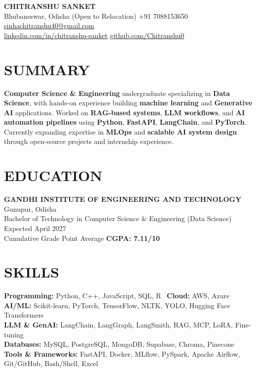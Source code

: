 \documentclass[a4paper,10pt]{article}
\begin{document}
\begin{center}
    {\LARGE \textbf{CHITRANSHU SANKET}} \\
    Bhubaneswar, Odisha (Open to Relocation) \quad
    \textbar \quad +91 7088153650 \quad
    \textbar \quad \href{mailto:sinhachitranshu40@gmail.com}{sinhachitranshu40@gmail.com} \\
    \href{https://www.linkedin.com/in/chitranshu-sanket}{linkedin.com/in/chitranshu-sanket}
    \textbar 
    \href{https://github.com/Chitranshu0}{ github.com/Chitranshu0}
\end{center}

\section*{SUMMARY}
\textbf{Computer Science \& Engineering} undergraduate specializing in \textbf{Data Science}, with hands-on experience building \textbf{machine learning} and \textbf{Generative AI} applications. Worked on \textbf{RAG-based systems}, \textbf{LLM workflows}, and \textbf{AI automation pipelines} using \textbf{Python}, \textbf{FastAPI}, \textbf{LangChain}, and \textbf{PyTorch}. Currently expanding expertise in \textbf{MLOps} and \textbf{scalable AI system design} through open-source projects and internship experience.

\section*{EDUCATION}
\textbf{GANDHI INSTITUTE OF ENGINEERING AND TECHNOLOGY} \hfill Gunupur, Odisha \\
Bachelor of Technology in Computer Science \& Engineering (Data Science) \hfill Expected April 2027 \\
Cumulative Grade Point Average \hfill \textbf{CGPA: 7.11/10}

\section*{SKILLS}
\textbf{Programming:} Python, C++, JavaScript, SQL, R \textbar\ \textbf{Cloud:} AWS, Azure\\
\textbf{AI/ML:} Scikit-learn, PyTorch, TensorFlow, NLTK, YOLO, Hugging Face Transformers \\
\textbf{LLM \& GenAI:} LangChain, LangGraph, LangSmith, RAG, MCP, LoRA, Fine-tuning \\
\textbf{Databases:} MySQL, PostgreSQL, MongoDB, Supabase, Chroma, Pinecone \\
\textbf{Tools \& Frameworks:} FastAPI, Docker, MLflow, PySpark, Apache Airflow, Git/GitHub, Bash/Shell, Excel
\end{document}
